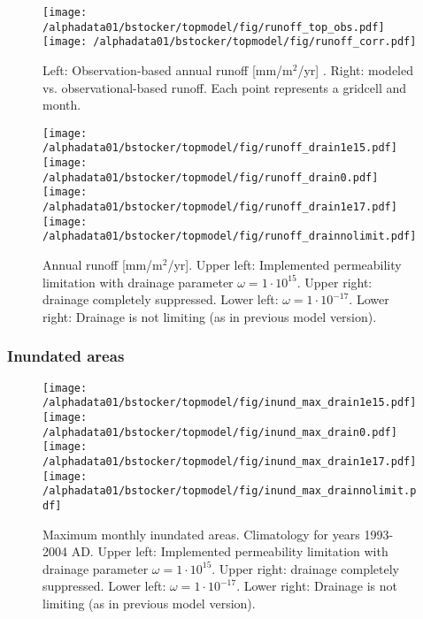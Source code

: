 \begin{figure}[ht!]
\begin{center}
  \texttt{[image: /alphadata01/bstocker/topmodel/fig/runoff\_top\_obs.pdf]}
  \texttt{[image: /alphadata01/bstocker/topmodel/fig/runoff\_corr.pdf]}
\end{center}
\caption{Left: Observation-based annual runoff [mm/m$^2$/yr] \citep{grdc}. Right: modeled vs. observational-based runoff. Each point represents a gridcell and month.}
\label{fig:runoff_obs}
\end{figure}

\begin{figure}[ht!]
\begin{center}
  \texttt{[image: /alphadata01/bstocker/topmodel/fig/runoff\_drain1e15.pdf]}
  \texttt{[image: /alphadata01/bstocker/topmodel/fig/runoff\_drain0.pdf]}\\
  \texttt{[image: /alphadata01/bstocker/topmodel/fig/runoff\_drain1e17.pdf]}
  \texttt{[image: /alphadata01/bstocker/topmodel/fig/runoff\_drainnolimit.pdf]}
\end{center}
\caption{Annual runoff [mm/m$^2$/yr]. Upper left:  Implemented permeability limitation with drainage parameter $\omega=1\cdot 10^{15}$. Upper right: drainage completely suppressed. Lower left: $\omega=1\cdot 10^{-17}$. Lower right: Drainage is not limiting (as in previous model version).}
\label{fig:runoff}
\end{figure}

\clearpage
\subsubsection{Inundated areas}

\begin{figure}[ht!]
\begin{center}
  \texttt{[image: /alphadata01/bstocker/topmodel/fig/inund\_max\_drain1e15.pdf]}
  \texttt{[image: /alphadata01/bstocker/topmodel/fig/inund\_max\_drain0.pdf]}\\
  \texttt{[image: /alphadata01/bstocker/topmodel/fig/inund\_max\_drain1e17.pdf]}
  \texttt{[image: /alphadata01/bstocker/topmodel/fig/inund\_max\_drainnolimit.pdf]}
\end{center}
\caption{Maximum monthly inundated areas. Climatology for years 1993-2004 AD. Upper left:  Implemented permeability limitation with drainage parameter $\omega=1\cdot 10^{15}$. Upper right: drainage completely suppressed. Lower left: $\omega=1\cdot 10^{-17}$. Lower right: Drainage is not limiting (as in previous model version).}
\label{fig:inund}
\end{figure}

